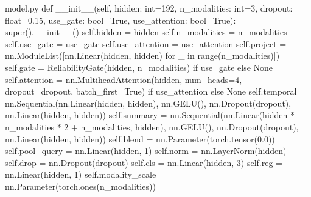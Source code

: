 \documentclass[bwprint]{gmcmthesis}
\begin{document}
\begin{appendices}
\begin{Python}{model.py}
    def __init__(self, hidden: int=192, n_modalities: int=3, dropout: float=0.15, use_gate: bool=True, use_attention: bool=True):
        super().__init__()
        self.hidden = hidden
        self.n_modalities = n_modalities
        self.use_gate = use_gate
        self.use_attention = use_attention
        self.project = nn.ModuleList([nn.Linear(hidden, hidden) for _ in range(n_modalities)])
        self.gate = ReliabilityGate(hidden, n_modalities) if use_gate else None
        self.attention = nn.MultiheadAttention(hidden, num_heads=4, dropout=dropout, batch_first=True) if use_attention else None
        self.temporal = nn.Sequential(nn.Linear(hidden, hidden), nn.GELU(), nn.Dropout(dropout), nn.Linear(hidden, hidden))
        self.summary = nn.Sequential(nn.Linear(hidden * n_modalities * 2 + n_modalities, hidden), nn.GELU(), nn.Dropout(dropout), nn.Linear(hidden, hidden))
        self.blend = nn.Parameter(torch.tensor(0.0))
        self.pool_query = nn.Linear(hidden, 1)
        self.norm = nn.LayerNorm(hidden)
        self.drop = nn.Dropout(dropout)
        self.cls = nn.Linear(hidden, 3)
        self.reg = nn.Linear(hidden, 1)
        self.modality_scale = nn.Parameter(torch.ones(n_modalities))


\end{Python}
\end{appendices}
\end{document}
